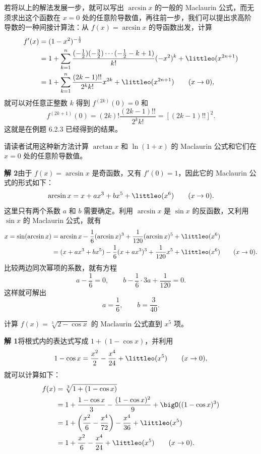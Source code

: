 \begin{xremark}
若将以上的解法发展一步，就可以写出 $\arcsin x$ 的一般的 Maclaurin 公式，而无须求出这个函数在 $x=0$ 处的任意阶导数值，再往前一步，我们可以提出求高阶导数的一种间接计算法：从 $f(x)=\arcsin x$ 的导函数出发，计算
\[
  \begin{aligned}
  f'(x)&=(1-x^2)^{-\frac12}\\
  &=1+\sum_{k=1}^n
  \frac{(-\frac12)(-\frac32)\cdots(-\frac12-k+1)}{k!}(-x^2)^k
  +\littleo(x^{2n+1})\\
  &=1+\sum_{k=1}^n\frac{(2k-1)!!}{2^k k!}x^{2k}+\littleo(x^{2n+1})\qquad(x\to0),
  \end{aligned}
\]
就可以对任意正整数 $k$ 得到 $f^{(2k)}(0)=0$ 和
\[
  f^{(2k+1)}(0)=(2k)!\frac{(2k-1)!!}{2^k k!}=[(2k-1)!!]^2.
\]
这就是在例题 6.2.3 已经得到的结果。

请读者试用这种新方法计算 $\arctan x$ 和 $\ln(1+x)$ 的 Maclaurin 公式和它们在 $x=0$ 处的任意阶导数值。
\end{xremark}

\begin{xsolution}
\textbf{解 2}\quad 由于 $f(x)=\arcsin x$ 是奇函数，又有 $f'(0)=1$，因此它的 Maclaurin 公式的形式如下：
\[
  \arcsin x=x+ax^3+bx^5+\littleo(x^6)\qquad(x\to0).
\]
这里只有两个系数 $a$ 和 $b$ 需要确定。利用 $\arcsin x$ 是 $\sin x$ 的反函数，又利用 $\sin x$ 的 Maclaurin 公式，就有
\[
  \begin{aligned}
  x=\sin(\arcsin x)
  &=\arcsin x-\frac16(\arcsin x)^3+\frac{1}{120}(\arcsin x)^5+\littleo(x^6)\\
  &=(x+ax^3+bx^5)-\frac16(x+ax^3)^3+\frac{1}{120}x^5+\littleo(x^6)\qquad(x\to0).
  \end{aligned}
\]
比较两边同次幂项的系数，就有方程
\[
  a-\frac16=0,\qquad b-\frac16\cdot3a+\frac{1}{120}=0.
\]
这样就可解出
\[
  a=\frac16,\qquad b=\frac{3}{40}.
\]
\end{xsolution}

\begin{xexample}[7.2.2]
计算 $f(x)=\sqrt[3]{2-\cos x}$ 的 Maclaurin 公式直到 $x^5$ 项。
\end{xexample}
\begin{xsolution}
\textbf{解 1}\quad 将根式内的表达式写成 $1+(1-\cos x)$，并利用
\[
  1-\cos x=\frac{x^2}{2}-\frac{x^4}{24}+\littleo(x^5)\qquad(x\to0),
\]
就可以计算如下：
\[
  \begin{aligned}
  f(x)&=\sqrt[3]{1+(1-\cos x)}\\
  &=1+\frac{1-\cos x}{3}-\frac{(1-\cos x)^2}{9}+\bigO((1-\cos x)^3)\\
  &=1+\left(\frac{x^2}{6}-\frac{x^4}{72}\right)-\frac{x^4}{36}+\littleo(x^5)\\
  &=1+\frac{x^2}{6}-\frac{x^4}{24}+\littleo(x^5)\qquad(x\to0).
  \end{aligned}
\]
\end{xsolution}

